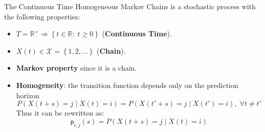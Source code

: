 \documentclass[12pt,a4paper]{article}
\newcommand*{\transp}{\mathsf{p}}
\begin{document}
\bigskip
\noindent
The Continuous Time Homogeneous Markov Chains is a stochastic process with the following properties:
\begin{itemize}
\item $T=\mathbb{R}^+\Rightarrow\left\lbrace t\in\mathbb{R}:\;t\geq 0\right\rbrace $ (\textbf{Continuous Time}).
\item $X(t)\in \mathcal{X}=\left\lbrace 1,2,\dots\right\rbrace$ (\textbf{Chain}).
\item \textbf{Markov property} since it is a chain.
\item \textbf{Homogeneity}: the transition function depends only on the prediction horizon
$$
P\left(X(t+s)=j \mid X(t)=i\right) = P\left(X(t'+s)=j \mid X(t')=i\right),\;\forall t\neq t'
$$
Thus it can be rewritten as:
$$
\transp_{i,j}(s) = P\left(X(t+s)=j \mid X(t)=i\right)
$$
\end{itemize} 
\end{document}
